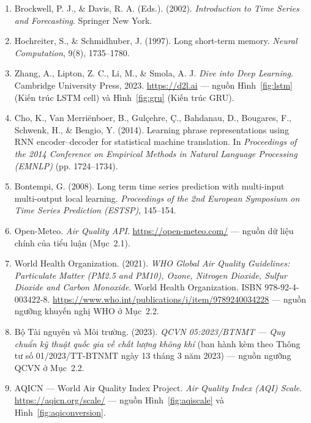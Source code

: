 \documentclass[12pt,oneside]{report}
\begin{document}
\begin{enumerate}
    \item Brockwell, P. J., \& Davis, R. A. (Eds.). (2002). \textit{Introduction to Time Series and Forecasting}. Springer New York.
    \item Hochreiter, S., \& Schmidhuber, J. (1997). Long short-term memory. \textit{Neural Computation}, 9(8), 1735–1780.
    \item Zhang, A., Lipton, Z. C., Li, M., \& Smola, A. J. \textit{Dive into Deep Learning}. Cambridge University Press, 2023. \url{https://d2l.ai} — nguồn Hình~\ref{fig:lstm} (Kiến trúc LSTM cell) và Hình~\ref{fig:gru} (Kiến trúc GRU).
    \item Cho, K., Van Merriënboer, B., Gulçehre, Ç., Bahdanau, D., Bougares, F., Schwenk, H., \& Bengio, Y. (2014). Learning phrase representations using RNN encoder–decoder for statistical machine translation. In \textit{Proceedings of the 2014 Conference on Empirical Methods in Natural Language Processing (EMNLP)} (pp. 1724–1734).
    \item Bontempi, G. (2008). Long term time series prediction with multi-input multi-output local learning. \textit{Proceedings of the 2nd European Symposium on Time Series Prediction (ESTSP)}, 145–154.
    \item Open-Meteo. \textit{Air Quality API}. \url{https://open-meteo.com/} — nguồn dữ liệu chính của tiểu luận (Mục~2.1).
    \item World Health Organization. (2021). \textit{WHO Global Air Quality Guidelines: Particulate Matter (PM2.5 and PM10), Ozone, Nitrogen Dioxide, Sulfur Dioxide and Carbon Monoxide}. World Health Organization. ISBN 978-92-4-003422-8. \url{https://www.who.int/publications/i/item/9789240034228} — nguồn ngưỡng khuyến nghị WHO ở Mục~2.2.
    \item Bộ Tài nguyên và Môi trường. (2023). \textit{QCVN 05:2023/BTNMT — Quy chuẩn kỹ thuật quốc gia về chất lượng không khí} (ban hành kèm theo Thông tư số 01/2023/TT-BTNMT ngày 13 tháng 3 năm 2023) — nguồn ngưỡng QCVN ở Mục~2.2.
    \item AQICN — World Air Quality Index Project. \textit{Air Quality Index (AQI) Scale}. \url{https://aqicn.org/scale/} — nguồn Hình~\ref{fig:aqiscale} và Hình~\ref{fig:aqiconversion}.
\end{enumerate}
\end{document}
